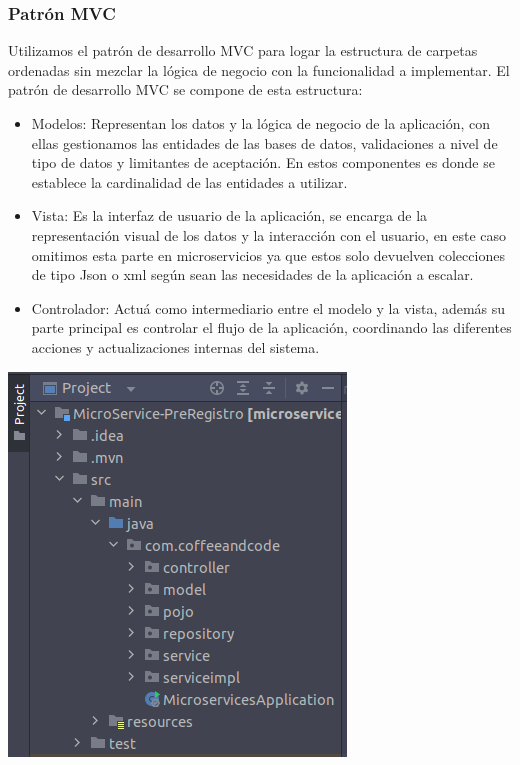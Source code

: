 	\subsubsection{Patrón MVC}
	Utilizamos el patrón de desarrollo MVC para logar la estructura de carpetas ordenadas sin mezclar la lógica de negocio con la funcionalidad a implementar. El patrón de desarrollo MVC se compone de esta estructura:
	\begin{itemize}
		\item Modelos: Representan los datos y la lógica de negocio de la aplicación, con ellas gestionamos las entidades de las bases de datos, validaciones a nivel de tipo de datos y limitantes de aceptación.
		En estos componentes es donde se establece la cardinalidad de las entidades a utilizar.
		\item Vista: Es la interfaz de usuario de la aplicación, se encarga de la representación visual de los datos y la interacción con el usuario, en este caso omitimos esta parte en microservicios ya que estos solo devuelven colecciones de tipo Json o xml según sean las necesidades de la aplicación a escalar.
		\item Controlador: Actuá como intermediario entre el modelo y la vista, además su parte principal es controlar el flujo de la aplicación, coordinando las diferentes acciones y actualizaciones internas del sistema.
	\end{itemize}
	\begin{minipage}{0.3\textwidth}
		\includegraphics[width=\linewidth]{img/mvc.png}
	\end{minipage}
